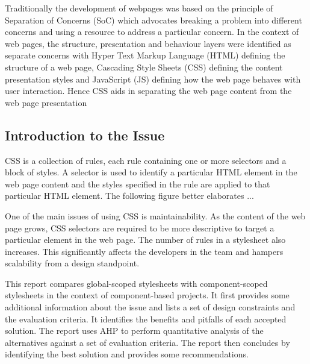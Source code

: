 \documentclass[12pt]{article}
\begin{document}
Traditionally the development of webpages was based on the principle of Separation of Concerns (SoC) which advocates breaking a problem into different concerns and using a resource to address a particular concern. In the context of web pages, the structure, presentation and behaviour layers were identified as separate concerns with Hyper Text Markup Language (HTML) defining the structure of a web page, Cascading Style Sheets (CSS) defining the content presentation styles and JavaScript (JS) defining how the web page behaves with user interaction. Hence CSS aids in separating the web page content from the web page presentation


\subsection{Introduction to the Issue}
CSS is a collection of rules, each rule containing one or more selectors and a block of styles. A selector is used to identify a particular HTML element in the web page content and the styles specified in the rule are applied to that particular HTML element. The following figure better elaborates ... 


One of the main issues of using CSS is maintainability. As the content of the web page grows, CSS selectors are required to be more descriptive to target a particular element in the web page. The number of rules in a stylesheet also increases. This significantly affects the developers in the team and hampers scalability from a design standpoint.

This report compares global-scoped stylesheets with component-scoped stylesheets in the context of component-based projects. It first provides some additional information about the issue and lists a set of design constraints and the evaluation criteria. It identifies the benefits and pitfalls of each accepted solution. The report uses AHP to perform quantitative analysis of the alternatives against a set of evaluation criteria. The report then concludes by identifying the best solution and provides some recommendations.





\end{document}
